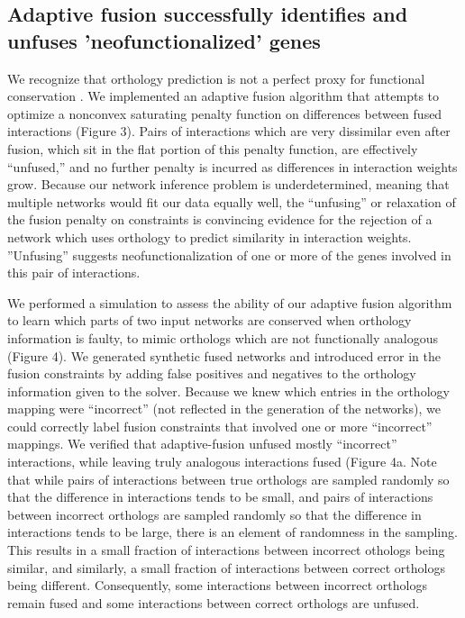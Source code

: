 \documentclass[11pt]{article}
\begin{document}
\subsection{Adaptive fusion successfully identifies and unfuses 'neofunctionalized' genes}
We recognize that orthology prediction is not a perfect proxy for functional conservation \cite{gabaldon_functional_2013, studer_how_2009, nehrt_testing_2011}. We implemented an adaptive fusion algorithm that attempts to optimize a nonconvex saturating penalty function on differences between fused interactions (Figure 3). Pairs of interactions which are very dissimilar even after fusion, which sit in the flat portion of this penalty function, are effectively ``unfused,'' and no further penalty is incurred as differences in interaction weights grow. Because our network inference problem is underdetermined, meaning that multiple networks would fit our data equally well, the ``unfusing'' or relaxation of the fusion penalty on constraints is convincing evidence for the rejection of a network which uses orthology to predict similarity in interaction weights. ''Unfusing'' suggests neofunctionalization of one or more of the genes involved in this pair of interactions.

We performed a simulation to assess the ability of our adaptive fusion algorithm to learn which parts of two input networks are conserved when orthology information is faulty, to mimic orthologs which are not functionally analogous  (Figure 4). We generated synthetic fused networks and introduced error in the fusion constraints by adding false positives and negatives to the orthology information given to the solver. Because we knew which entries in the orthology mapping were ``incorrect'' (not reflected in the generation of the networks), we could correctly label fusion constraints that involved one or more ``incorrect'' mappings. We verified that adaptive-fusion unfused mostly ``incorrect'' interactions, while leaving truly analogous interactions fused (Figure 4a. Note that while pairs of interactions between true orthologs are sampled randomly so that the difference in interactions tends to be small, and pairs of interactions between incorrect orthologs are sampled randomly so that the difference in interactions tends to be large, there is an element of randomness in the sampling. This results in a small fraction of interactions between incorrect othologs being similar, and similarly, a small fraction of interactions between correct orthologs being different. Consequently, some interactions between incorrect orthologs remain fused and some interactions between correct orthologs are unfused. 
\end{document}
